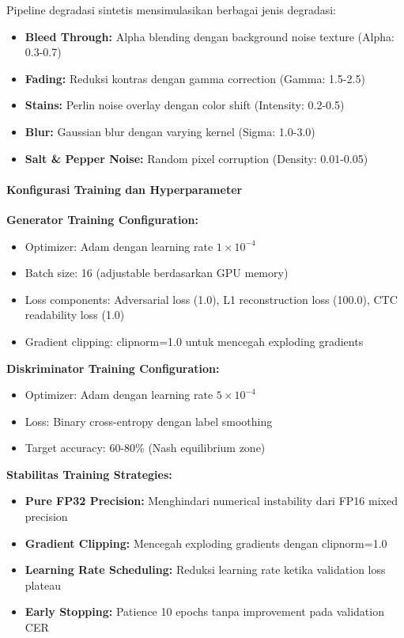 \documentclass[12pt,a4paper]{article}
\begin{document}
Pipeline degradasi sintetis mensimulasikan berbagai jenis degradasi:
\begin{itemize}
    \item \textbf{Bleed Through:} Alpha blending dengan background noise texture (Alpha: 0.3-0.7)
    \item \textbf{Fading:} Reduksi kontras dengan gamma correction (Gamma: 1.5-2.5)
    \item \textbf{Stains:} Perlin noise overlay dengan color shift (Intensity: 0.2-0.5)
    \item \textbf{Blur:} Gaussian blur dengan varying kernel (Sigma: 1.0-3.0)
    \item \textbf{Salt \& Pepper Noise:} Random pixel corruption (Density: 0.01-0.05)
\end{itemize}

\paragraph{Konfigurasi Training dan Hyperparameter}
\textbf{Generator Training Configuration:}
\begin{itemize}
    \item Optimizer: Adam dengan learning rate $1 \times 10^{-4}$
    \item Batch size: 16 (adjustable berdasarkan GPU memory)
    \item Loss components: Adversarial loss (1.0), L1 reconstruction loss (100.0), CTC readability loss (1.0)
    \item Gradient clipping: clipnorm=1.0 untuk mencegah exploding gradients
\end{itemize}

\textbf{Diskriminator Training Configuration:}
\begin{itemize}
    \item Optimizer: Adam dengan learning rate $5 \times 10^{-4}$
    \item Loss: Binary cross-entropy dengan label smoothing
    \item Target accuracy: 60-80\% (Nash equilibrium zone)
\end{itemize}

\textbf{Stabilitas Training Strategies:}
\begin{itemize}
    \item \textbf{Pure FP32 Precision:} Menghindari numerical instability dari FP16 mixed precision
    \item \textbf{Gradient Clipping:} Mencegah exploding gradients dengan clipnorm=1.0
    \item \textbf{Learning Rate Scheduling:} Reduksi learning rate ketika validation loss plateau
    \item \textbf{Early Stopping:} Patience 10 epochs tanpa improvement pada validation CER
\end{itemize}
\end{document}
